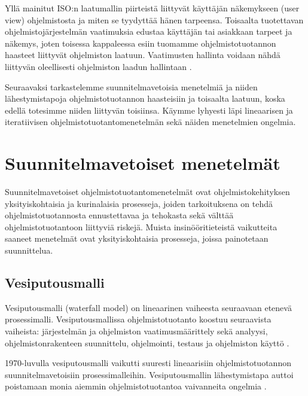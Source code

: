 \documentclass[finnish]{tktltiki2}
\theoremstyle{definition}
\theoremstyle{remark}
\begin{document}
Yllä mainitut ISO:n laatumallin piirteistä liittyvät käyttäjän näkemykseen (user view) ohjelmistosta ja miten se tyydyttää hänen tarpeensa. Toisaalta tuotettavan ohjelmistojärjestelmän vaatimuksia edustaa käyttäjän tai asiakkaan tarpeet ja näkemys, joten toisessa kappaleessa esiin tuomamme ohjelmistotuotannon haasteet liittyvät ohjelmiston laatuun. Vaatimusten hallinta voidaan nähdä liittyvän oleellisesti ohjelmiston laadun hallintaan \cite{KIP96}. 

Seuraavaksi tarkastelemme suunnitelmavetoisia menetelmiä ja niiden lähestymistapoja ohjelmistotuotannon haasteisiin ja toisaalta laatuun, koska edellä totesimme niiden liittyvän toisiinsa. Käymme lyhyesti läpi lineaarisen ja iteratiivisen ohjelmistotuotantomenetelmän sekä näiden menetelmien ongelmia.

\section{Suunnitelmavetoiset menetelmät}

Suunnitelmavetoiset ohjelmistotuotantomenetelmät ovat ohjelmistokehityksen yksityiskohtaisia ja kurinalaisia prosesseja, joiden tarkoituksena on tehdä ohjelmistotuotannosta ennustettavaa ja tehokasta sekä välttää ohjelmistotuotantoon liittyviä riskejä. Muista insinööritieteistä vaikutteita saaneet menetelmät ovat yksityiskohtaisia prosesseja, joissa painotetaan suunnittelua\cite{FOW01a}.

\subsection{Vesiputousmalli}

Vesiputousmalli (waterfall model) on lineaarinen vaiheesta seuraavaan etenevä prosessimalli. Vesiputousmallissa ohjelmistotuotanto koostuu seuraavista vaiheista: järjestelmän ja ohjelmiston vaatimusmäärittely sekä analyysi, ohjelmistonrakenteen suunnittelu, ohjelmointi, testaus ja ohjelmiston käyttö \cite{ROY70}.

1970-luvulla vesiputousmalli vaikutti suuresti lineaarisiin ohjelmistotuotannon suunnitelmavetoisiin prosessimalleihin. Vesiputousmallin lähestymistapa auttoi poistamaan monia aiemmin ohjelmistotuotantoa vaivanneita ongelmia \cite{BOE88}.
\end{document}
